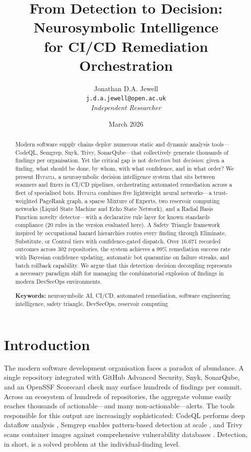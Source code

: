 \documentclass[11pt,a4paper]{article}
\title{%
  \textbf{From Detection to Decision: Neurosymbolic Intelligence\\
  for CI/CD Remediation Orchestration}
}
\author{
  Jonathan D.A. Jewell\\
  \texttt{j.d.a.jewell@open.ac.uk}\\
  \textit{Independent Researcher}
}
\date{March 2026}
\begin{document}
\maketitle

\begin{abstract}
Modern software supply chains deploy numerous static and dynamic analysis tools---CodeQL, Semgrep, Snyk, Trivy, SonarQube---that collectively generate thousands of findings per organisation. Yet the critical gap is not \emph{detection} but \emph{decision}: given a finding, what should be done, by whom, with what confidence, and in what order? We present \textsc{Hypatia}, a neurosymbolic decision intelligence system that sits between scanners and fixers in CI/CD pipelines, orchestrating automated remediation across a fleet of specialised bots. \textsc{Hypatia} combines five lightweight neural networks---a trust-weighted PageRank graph, a sparse Mixture of Experts, two reservoir computing networks (Liquid State Machine and Echo State Network), and a Radial Basis Function novelty detector---with a declarative rule layer for known standards compliance (20 rules in the version evaluated here). A Safety Triangle framework inspired by occupational hazard hierarchies routes every finding through Eliminate, Substitute, or Control tiers with confidence-gated dispatch. Over 16{,}671 recorded outcomes across 302 repositories, the system achieves a 99\% remediation success rate with Bayesian confidence updating, automatic bot quarantine on failure streaks, and batch rollback capability. We argue that this detection--decision decoupling represents a necessary paradigm shift for managing the combinatorial explosion of findings in modern DevSecOps environments.

\medskip
\noindent\textbf{Keywords:} neurosymbolic AI, CI/CD, automated remediation, software engineering intelligence, safety triangle, DevSecOps, reservoir computing
\end{abstract}

\section{Introduction}
\label{sec:introduction}

The modern software development organisation faces a paradox of abundance. A single repository integrated with GitHub Advanced Security, Snyk, SonarQube, and an OpenSSF Scorecard check may surface hundreds of findings per commit. Across an ecosystem of hundreds of repositories, the aggregate volume easily reaches thousands of actionable---and many non-actionable---alerts. The tools responsible for this output are increasingly sophisticated: CodeQL performs deep dataflow analysis \citep{codeql2019}, Semgrep enables pattern-based detection at scale \citep{semgrep2020}, and Trivy scans container images against comprehensive vulnerability databases \citep{trivy2019}. Detection, in short, is a solved problem at the individual-finding level.
\end{document}
